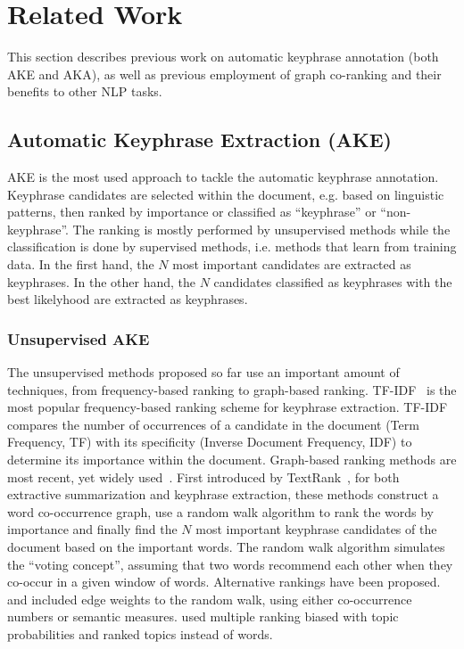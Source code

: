 \section{Related Work}
\label{sec:related_work}
  This section describes previous work on automatic keyphrase annotation (both
  AKE and AKA), as well as previous employment of graph co-ranking and their
  benefits to other NLP tasks.

  \subsection{Automatic Keyphrase Extraction (AKE)}
  \label{subsec:ake}
    AKE is the most used approach to tackle the automatic keyphrase annotation.
    Keyphrase candidates are selected within the document, e.g. based on
    linguistic patterns, then ranked by importance or classified as
    ``keyphrase'' or ``non-keyphrase''. The ranking is
    mostly performed by unsupervised methods while the classification is done by
    supervised methods, i.e. methods that learn from training data. In the first
    hand, the $N$ most important candidates are extracted as keyphrases. In the
    other hand, the $N$ candidates classified as keyphrases with the best
    likelyhood are extracted as keyphrases.

    \subsubsection{Unsupervised AKE}
    \label{subsubsec:unsupervised_ake}
      The unsupervised methods proposed so far use an important amount of
      techniques, from frequency-based ranking to graph-based ranking.
      TF-IDF~\cite{jones1972tfidf} is the most popular frequency-based ranking
      scheme for keyphrase extraction. TF-IDF compares the number of occurrences
      of a candidate in the document (Term Frequency, TF) with its specificity
      (Inverse Document Frequency, IDF) to
      determine its importance within the document. Graph-based ranking methods
      are most recent, yet widely
      used~\cite{mihalcea2004textrank,wan2008expandrank,tsatsaronis2010semanticrank,liu2010topicalpagerank,bougouin2013topicrank}. First introduced by
      TextRank~\cite{mihalcea2004textrank}, for both extractive summarization
      and  keyphrase extraction, these methods construct a word co-occurrence
      graph, use a random walk algorithm to rank the words by importance and
      finally find the $N$ most important keyphrase candidates of the document
      based on the important words. The
      random walk algorithm simulates the ``voting concept'', assuming that two
      words recommend each other when they co-occur in a given window of words.
      Alternative rankings have been proposed.  and
       included edge weights to the
      random walk, using either co-occurrence numbers or semantic measures.
       used multiple ranking biased with topic
      probabilities and  ranked topics instead of
      words.

